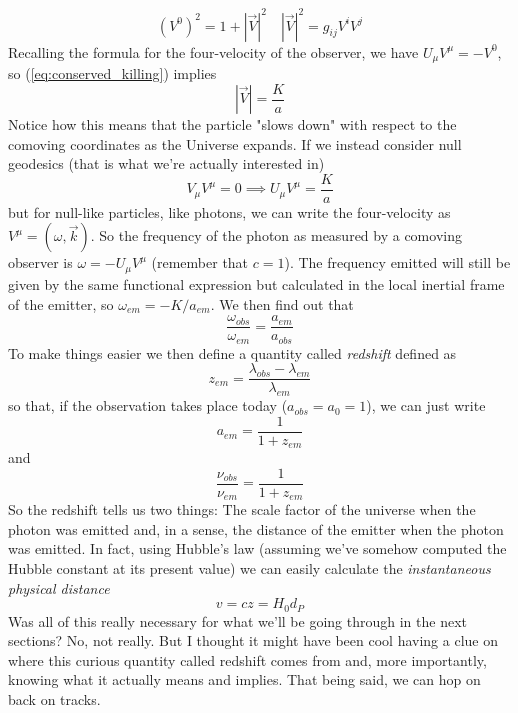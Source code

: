 \begin{equation*}
    (V^{0})^{2} = 1+|\vec{V}|^{2} \quad |\vec{V}|^{2} = g_{ij}V^{i}V^{j}
\end{equation*}
Recalling the formula for the four-velocity of the observer, we have $U_{\mu}V^{\mu} = -V^{0}$, so (\ref{eq:conserved_killing}) implies
\begin{equation*}
    |\vec{V}| = \frac{K}{a}
\end{equation*}
Notice how this means that the particle "slows down" with respect to the comoving coordinates as the Universe expands. If we instead consider null geodesics (that is what we're actually interested in)
\begin{equation*}
    V_{\mu}V^{\mu} = 0 \implies U_{\mu}V^{\mu} = \frac{K}{a}
\end{equation*}
but for null-like particles, like photons, we can write the four-velocity as $V^{\mu} = (\omega, \vec{k})$. So the frequency of the photon as measured by a comoving observer is $\omega = -U_{\mu}V^{\mu}$ (remember that $c=1$). The frequency emitted will still be given by the same functional expression but calculated in the local inertial frame of the emitter, so $\omega_{em} = -K/a_{em}$. We then find out that 
\begin{equation*}
    \frac{\omega_{obs}}{\omega_{em}} = \frac{a_{em}}{a_{obs}}
\end{equation*}
To make things easier we then define a quantity called \emph{redshift} defined as 
\begin{equation*}
    z_{em} = \frac{\lambda_{obs}-\lambda_{em}}{\lambda_{em}}
\end{equation*}
so that, if the observation takes place today ($a_{obs} = a_{0} = 1$), we can just write 
\begin{equation*}
    a_{em} = \frac{1}{1+z_{em}}
\end{equation*}
and 
\begin{equation}
    \boxed{
    \frac{\nu_{obs}}{\nu_{em}} = \frac{1}{1+z_{em}}
    }
    \label{eq:cosmological_redshift}
\end{equation}
So the redshift tells us two things: The scale factor of the universe when the photon was emitted and, in a sense, the distance of the emitter when the photon was emitted. In fact, using Hubble's law (assuming we've somehow computed the Hubble constant at its present value) we can easily calculate the \emph{instantaneous physical distance}
\begin{equation*}
    v = cz = H_{0}d_{P}
\end{equation*}
Was all of this really necessary for what we'll be going through in the next sections? No, not really. But I thought it might have been cool having a clue on where this curious quantity called redshift comes from and, more importantly, knowing what it actually means and implies. That being said, we can hop on back on tracks.
